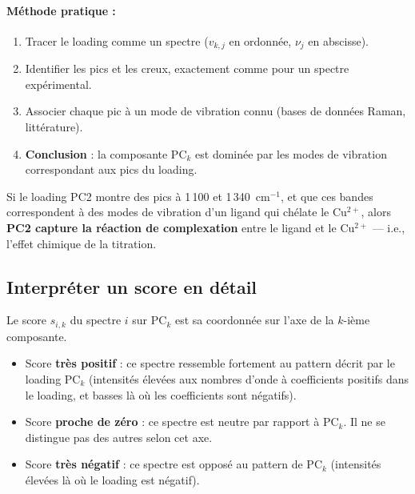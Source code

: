\documentclass[12pt, a4paper]{article}
\newcommand{\cm}{cm$^{-1}$}
\begin{document}
\paragraph{Méthode pratique :}
\begin{enumerate}
  \item Tracer le loading comme un spectre ($v_{k,j}$ en ordonnée,
        $\nu_j$ en abscisse).
  \item Identifier les pics et les creux, exactement comme pour un spectre
        expérimental.
  \item Associer chaque pic à un mode de vibration connu (bases de données
        Raman, littérature).
  \item \textbf{Conclusion} : la composante PC$_k$ est dominée par les modes
        de vibration correspondant aux pics du loading.
\end{enumerate}

\begin{exemple}
Si le loading PC2 montre des pics à 1\,100 et 1\,340~\cm, et que ces bandes
correspondent à des modes de vibration d'un ligand qui chélate le Cu$^{2+}$,
alors \textbf{PC2 capture la réaction de complexation} entre le ligand et le
Cu$^{2+}$ — i.e., l'effet chimique de la titration.
\end{exemple}

\subsection{Interpréter un score en détail}

Le score $s_{i,k}$ du spectre $i$ sur PC$_k$ est sa \og coordonnée\fg{} sur
l'axe de la $k$-ième composante.

\begin{itemize}
  \item Score \textbf{très positif} : ce spectre ressemble fortement au pattern
        décrit par le loading PC$_k$ (intensités élevées aux nombres d'onde à
        coefficients positifs dans le loading, et basses là où les coefficients
        sont négatifs).

  \item Score \textbf{proche de zéro} : ce spectre est \og neutre\fg{} par
        rapport à PC$_k$. Il ne se distingue pas des autres selon cet axe.

  \item Score \textbf{très négatif} : ce spectre est \og opposé\fg{} au
        pattern de PC$_k$ (intensités élevées là où le loading est négatif).
\end{itemize}
\end{document}
